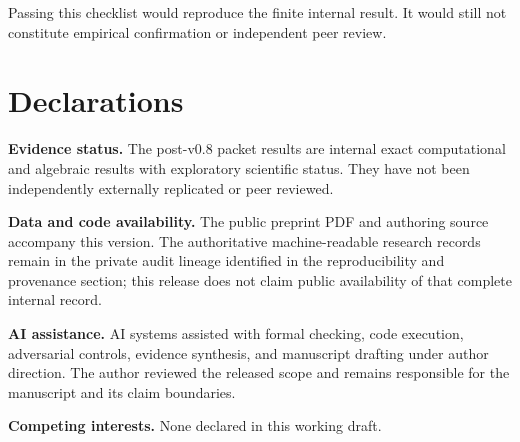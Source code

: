 \documentclass[12pt,a4paper,twoside]{article}
\begin{document}
Passing this checklist would reproduce the finite internal result. It would still not constitute empirical confirmation or independent peer review.

\section*{Declarations}

\textbf{Evidence status.} The post-v0.8 packet results are internal exact computational and algebraic results with exploratory scientific status. They have not been independently externally replicated or peer reviewed.

\textbf{Data and code availability.} The public preprint PDF and authoring source accompany this version. The authoritative machine-readable research records remain in the private audit lineage identified in the reproducibility and provenance section; this release does not claim public availability of that complete internal record.

\textbf{AI assistance.} AI systems assisted with formal checking, code execution, adversarial controls, evidence synthesis, and manuscript drafting under author direction. The author reviewed the released scope and remains responsible for the manuscript and its claim boundaries.

\textbf{Competing interests.} None declared in this working draft.
\end{document}
